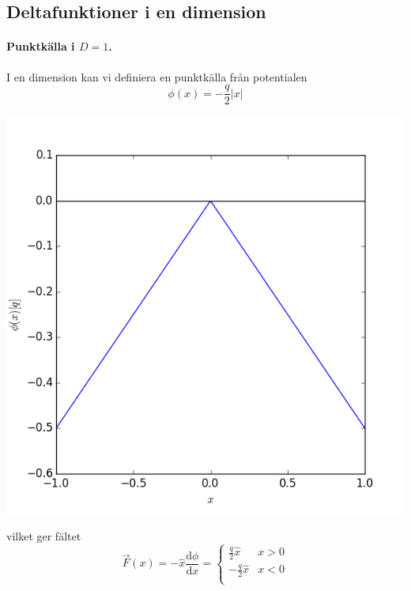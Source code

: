 \documentclass[%
oneside,                 %
final,                   %
10pt]{article}
\begin{document}
\subsection{Deltafunktioner i en dimension}

\paragraph{Punktkälla i $D=1$.}
I en dimension kan vi definiera en punktkälla från potentialen
\begin{equation}
\phi(x) = -\frac{q}{2} \left| x \right|
\end{equation}



\centerline{\includegraphics[width=0.8\linewidth]{fig/pointcharge_pot_1dim.png}}



vilket ger fältet
\begin{equation}
\vec{F}(x) = -\hat{x} \frac{\mbox{d}\phi}{\mbox{d}x} = 
\left\{
\begin{array}{ll}
\frac{q}{2} \hat{x} & x > 0 \\ 
-\frac{q}{2} \hat{x} & x < 0 \\ 
\end{array}
\right.
\end{equation}
\end{document}
